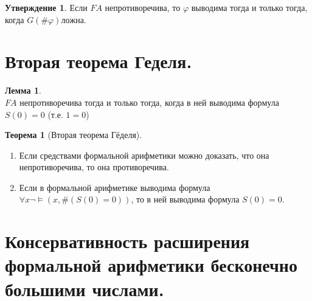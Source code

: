 \documentclass[a4paper,12pt]{article}
\theoremstyle{definition} %
\newtheorem{theorem}{Теорема}[section]
\newtheorem{lemma}{Лемма}[section]
\newtheorem{statement}{Утверждение}[section]
\theoremstyle{definition} %
\theoremstyle{remark} %
\begin{document}
	\begin{statement}
		Если $FA$ непротиворечива, то $\varphi$ выводима тогда и только тогда, когда $G(\# \varphi) ложна$.
	\end{statement}
 

\section{Вторая теорема Геделя.}
	\begin{lemma}\ \\[1ex]
		$FA$ непротиворечива тогда и только тогда, когда в ней выводима формула $S(0) = 0$ (т.е. $1 = 0$)
	\end{lemma}

	\begin{theorem}[Вторая теорема Гёделя]\ \\[1ex]
		\begin{enumerate}
			\item Если средствами формальной арифметики можно доказать, что она непротиворечива, то она противоречива.
			\item Если в формальной арифметике выводима формула $\forall x \neg \vDash (x, \#(S(0) = 0))$, то в ней выводима формула $S(0) = 0$.
		\end{enumerate}
	\end{theorem}

\section{Консервативность расширения формальной арифметики бесконечно большими числами.}
\end{document}
